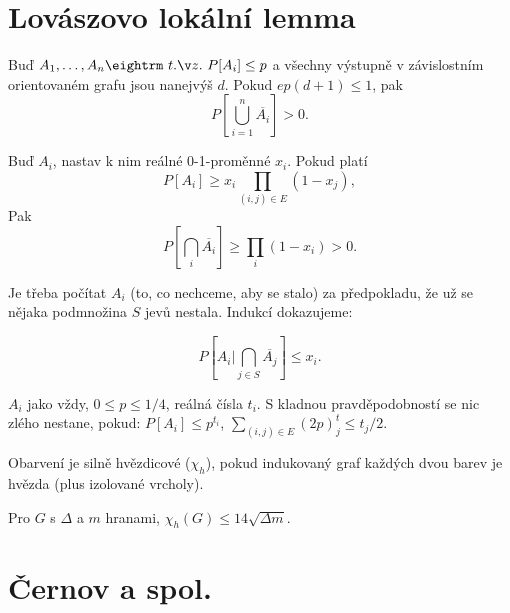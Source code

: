 \section{Lovászovo lokální lemma}

 Buď $A_1, \dots, A_n \st P[A_i] \le p$ a všech\-ny vý\-stup\-ně v zá\-vi\-slostním
orientovaném grafu jsou nanejvýš $d$. Pokud $ep(d+1) \le 1$, pak 
$$P[\bigcup_{i=1}^n \overline{A_i}] > 0.$$

\prf{} Buď $A_i$, nastav k nim reálné 0-1-proměnné $x_i$. Pokud platí
$$P[A_i] \ge x_i \prod_{(i,j) \in E} (1-x_j), $$
Pak
$$P[\bigcap_i \overline{A_i}] \ge \prod_i (1-x_i) > 0.$$

\prf{} Je třeba počítat $A_i$ (to, co nechceme, aby se stalo) za předpokladu, že
už se nějaka podmnožina $S$ jevů nestala. Indukcí dokazujeme:

$$ P[A_i|\bigcap_{j \in S} \overline{A_j}] \le x_i.$$


 $A_i$ jako vždy, $0 \le p \le 1/4$, reálná čísla $t_i$.
S kladnou pravděpodobností se nic zlého nestane, pokud:
\itemize\ibull
\: $P[A_i] \le p^{t_i}$,
\: $\sum_{(i,j) \in E} (2p)^t_j \le t_j /2$.
\endlist

\dfn{} Obarvení je {\I silně hvězdicové} ($\chi_h$), pokud indukovaný graf každých dvou barev
je hvězda (plus izolované vrcholy).

\thm{} Pro $G$ s $\Delta$ a $m$ hranami, $\chi_h(G) \le 14 \sqrt{\Delta m}$.

\prf{} 

\section{Černov a spol.}

\bye
